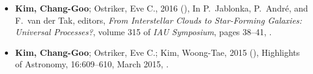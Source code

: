 \documentclass[12pt,preprint,letter]{aastex63}
\begin{document}
\begin{itemize}[itemsep=1pt]








\end{itemize}

\begin{itemize}[itemsep=1pt]
\item \textbf{Kim, Chang-Goo}; Ostriker, Eve C., 2016 (), In P.~{Jablonka},
  P.~{Andr{\'e}}, and F.~{van der Tak}, editors, {\em From Interstellar Clouds
  to Star-Forming Galaxies: Universal Processes?}, volume 315 of {\em IAU
  Symposium}, pages 38--41, .
\item \textbf{Kim, Chang-Goo}; Ostriker, Eve C.; Kim, Woong-Tae, 2015 (),
  Highlights of Astronomy, 16:609--610, March 2015, .
\end{itemize}

\end{document}
